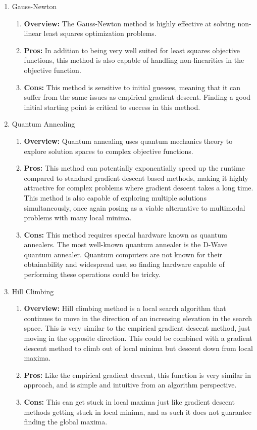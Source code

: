 \documentclass{article}
\begin{document}
\begin{enumerate}
\begin{enumerate}
    \end{enumerate}
\item Gauss-Newton
    \begin{enumerate}
        \item \textbf{Overview:} The Gauss-Newton method is highly effective at solving non-linear least squares optimization problems. 
        \item \textbf{Pros:} In addition to being very well suited for least squares objective functions, this method is also capable of handling non-linearities in the objective function. 
        \item \textbf{Cons:} This method is sensitive to initial guesses, meaning that it can suffer from the same issues as empirical gradient descent. Finding a good initial starting point is critical to success in this method. 
    \end{enumerate}
\item Quantum Annealing
    \begin{enumerate}
        \item \textbf{Overview:} Quantum annealing uses quantum mechanics theory to explore solution spaces to complex objective functions. 
        \item \textbf{Pros:} This method can potentially exponentially speed up the runtime compared to standard gradient descent based methods, making it highly attractive for complex problems where gradient descent takes a long time. This method is also capable of exploring multiple solutions simultaneously, once again posing as a viable alternative to multimodal problems with many local minima. 
        \item \textbf{Cons:} This method requires special hardware known as quantum annealers. The most well-known quantum annealer is the D-Wave quantum annealer. Quantum computers are not known for their obtainability and widespread use, so finding hardware capable of performing these operations could be tricky. 
    \end{enumerate}
\item Hill Climbing
    \begin{enumerate}
        \item \textbf{Overview:} Hill climbing method is a local search algorithm that continues to move in the direction of an increasing elevation in the search space. This is very similar to the empirical gradient descent method, just moving in the opposite direction. This could be combined with a gradient descent method to climb out of local minima but descent down from local maxima. 
        \item \textbf{Pros:} Like the empirical gradient descent, this function is very similar in approach, and is simple and intuitive from an algorithm perspective.
        \item \textbf{Cons:} This can get stuck in local maxima just like gradient descent methods getting stuck in local minima, and as such it does not guarantee finding the global maxima. 
    \end{enumerate}
\end{enumerate}
\end{document}
